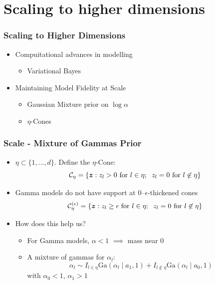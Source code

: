 \documentclass[aspectratio=169]{beamer}
\begin{document}
\section[Scaling]{Scaling to higher dimensions}

\begin{frame}
  \frametitle{Scaling to Higher Dimensions}
  \begin{itemize}
    \item Compuitational advances in modelling
      \begin{itemize}
        \item Variational Bayes~\citep{green2015}
      \end{itemize}
    \item Maintaining Model Fidelity at Scale
      \begin{itemize}
        \item Gaussian Mixture prior on $\log\alpha$
        \item $\eta$-Cones~\citep{goix2017}
      \end{itemize}
  \end{itemize}
\end{frame}

\begin{frame}
  \frametitle{Scale - Mixture of Gammas Prior}
  \begin{itemize}
    \item $\eta \subset \lbrace 1,\ldots,d\rbrace$.  Define the $\eta$-Cone:
      \begin{equation*}
        \mathcal{C}_{\eta} = \left\lbrace \bm{z} : z_l > 0 \text{ for }l\in\eta;
                              \hspace{0.2cm} z_l = 0 \text{ for }l\not\in\eta\right\rbrace
      \end{equation*}
    \pause
    \item Gamma models do not have support at 0--$\epsilon$-thickened cones
      \begin{equation*}
        \mathcal{C}_{\eta}^{(\epsilon)} = \left\lbrace \bm{z} : z_l \geq \epsilon
          \text{ for }l\in\eta; \hspace{0.2cm} z_l = 0 \text{ for }l\not\in\eta\right\rbrace
      \end{equation*}
    \pause
    \item How does this help us?
      \begin{itemize}
        \item For Gamma models, $\alpha < 1$ $\implies$ mass near 0
        \item A mixture of gammas for $\alpha_l$:
          \begin{equation*}
            \alpha_l \sim I_{l\in\eta}\text{Ga}(\alpha_l\mid a_1, 1)
                        + I_{l\not\in\eta}\text{Ga}(\alpha_l\mid a_0, 1)
          \end{equation*}
          with $\alpha_0 < 1$, $\alpha_1 > 1$
      \end{itemize}
  \end{itemize}
\end{frame}
\end{document}
